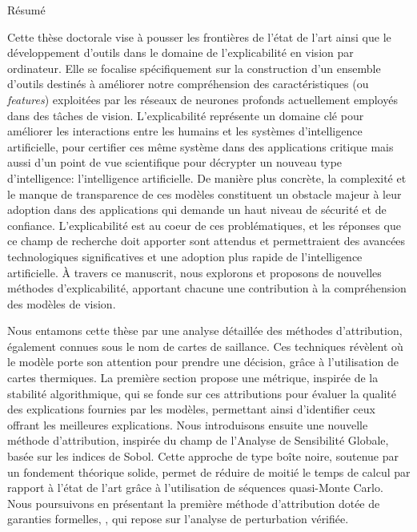 \begin{center}
{\Large Résumé \\ }
\end{center}

Cette thèse doctorale vise à pousser les frontières de l'état de l'art ainsi que le développement d'outils dans le domaine de l'explicabilité en vision par ordinateur. Elle se focalise spécifiquement sur la construction d'un ensemble d'outils destinés à améliorer notre compréhension des caractéristiques (ou \textit{features}) exploitées par les réseaux de neurones profonds actuellement employés dans des tâches de vision. L'explicabilité représente un domaine clé pour améliorer les interactions entre les humains et les systèmes d'intelligence artificielle, pour certifier ces même système dans des applications critique mais aussi d'un point de vue scientifique pour décrypter un nouveau type d'intelligence: l'intelligence artificielle. 
De manière plus concrète, la complexité et le manque de transparence de ces modèles constituent un obstacle majeur à leur adoption dans des applications qui demande un haut niveau de sécurité et de confiance. L'explicabilité est au coeur de ces problématiques, et les réponses que ce champ de recherche doit apporter sont attendus et permettraient des avancées technologiques significatives et une adoption plus rapide de l'intelligence artificielle. À travers ce manuscrit, nous explorons et proposons de nouvelles méthodes d'explicabilité, apportant chacune une contribution à la compréhension des modèles de vision.


Nous entamons cette thèse par une analyse détaillée des méthodes d'attribution, également connues sous le nom de cartes de saillance. Ces techniques révèlent où le modèle porte son attention pour prendre une décision, grâce à l'utilisation de cartes thermiques. La première section propose une métrique, inspirée de la stabilité algorithmique, qui se fonde sur ces attributions pour évaluer la qualité des explications fournies par les modèles, permettant ainsi d'identifier ceux offrant les meilleures explications. Nous introduisons ensuite une nouvelle méthode d'attribution, inspirée du champ de l'Analyse de Sensibilité Globale, basée sur les indices de Sobol. Cette approche de type boîte noire, soutenue par un fondement théorique solide, permet de réduire de moitié le temps de calcul par rapport à l'état de l'art grâce à l'utilisation de séquences quasi-Monte Carlo. Nous poursuivons en présentant la première méthode d'attribution dotée de garanties formelles, \eva, qui repose sur l'analyse de perturbation vérifiée.


